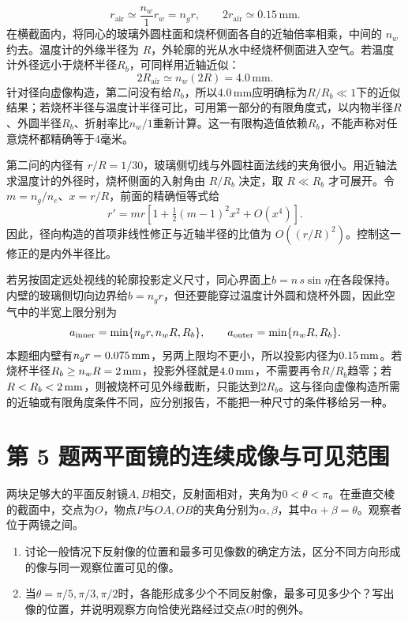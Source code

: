 \documentclass[UTF8,fontset=fandol,a4paper,11pt]{ctexart}
\begin{document}
\[
r_{\mathrm{air}}\simeq\frac{n_w}{1}r_w
=n_gr,\qquad
\boxed{2r_{\mathrm{air}}\simeq0.15\,\mathrm{mm}}.
\]
在横截面内，将同心的玻璃外圆柱面和烧杯侧面各自的近轴倍率相乘，中间的 $n_w$ 约去。温度计的外缘半径为 $R$，外轮廓的光从水中经烧杯侧面进入空气。若温度计外径远小于烧杯半径$R_b$，可同样用近轴近似：
\[
\boxed{2R_{\mathrm{air}}\simeq n_w(2R)=4.0\,\mathrm{mm}}.
\]
针对径向虚像构造，第二问没有给$R_b$，所以$4.0\,\mathrm{mm}$应明确标为$R/R_b\ll1$下的近似结果；若烧杯半径与温度计半径可比，可用第一部分的有限角度式，以内物半径$R$、外圆半径$R_b$、折射率比$n_w/1$重新计算。这一有限构造值依赖$R_b$，不能声称对任意烧杯都精确等于4毫米。


第二问的内径有 $r/R=1/30$，玻璃侧切线与外圆柱面法线的夹角很小。用近轴法求温度计的外径时，烧杯侧面的入射角由 $R/R_b$ 决定，取 $R\ll R_b$ 才可展开。令$m=n_g/n_e$、$x=r/R$，前面的精确恒等式给
\[
r'=mr\left[1+\tfrac12(m-1)^2x^2+O(x^4)\right].
\]
因此，径向构造的首项非线性修正与近轴半径的比值为 $O((r/R)^2)$。控制这一修正的是内外半径比。

若另按固定远处视线的轮廓投影定义尺寸，同心界面上$b=n\,s\sin\eta$在各段保持。内壁的玻璃侧切向边界给$b=n_gr$，但还要能穿过温度计外圆和烧杯外圆，因此空气中的半宽上限分别为
\[
a_{\rm inner}=\min\{n_gr,n_wR,R_b\},\qquad
a_{\rm outer}=\min\{n_wR,R_b\}.
\]
本题细内壁有$n_gr=0.075\,{\rm mm}$，另两上限均不更小，所以投影内径为$0.15\,{\rm mm}$。若烧杯半径$R_b\ge n_wR=2\,{\rm mm}$，投影外径就是$4.0\,{\rm mm}$，不需要再令$R/R_b$趋零；若$R<R_b<2\,{\rm mm}$，则被烧杯可见外缘截断，只能达到$2R_b$。这与径向虚像构造所需的近轴或有限角度条件不同，应分别报告，不能把一种尺寸的条件移给另一种。




\section*{第 5 题\quad 两平面镜的连续成像与可见范围}\label{q:5}

两块足够大的平面反射镜$A,B$相交，反射面相对，夹角为$0<\theta<\pi$。在垂直交棱的截面中，交点为$O$，物点$P$与$OA,OB$的夹角分别为$\alpha,\beta$，其中$\alpha+\beta=\theta$。观察者位于两镜之间。
\begin{enumerate}
\item 讨论一般情况下反射像的位置和最多可见像数的确定方法，区分不同方向形成的像与同一观察位置可见的像。
\item 当$\theta=\pi/5,\pi/3,\pi/2$时，各能形成多少个不同反射像，最多可见多少个？写出像的位置，并说明观察方向恰使光路经过交点$O$时的例外。
\end{enumerate}
\end{document}
